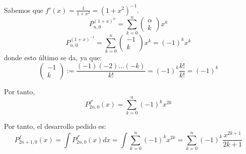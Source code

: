 \begin{ejercicio}
\begin{enumerate}
        Sabemos que $f'(x) = \frac{1}{1+x^2} = (1+x^2)^{-1}$.
        \begin{equation*}
            P_{n, 0}^{(1+x)^\alpha} = \sum_{k=0}^n \left(\begin{array}{c}
                \alpha \\ k \end{array} \right) x^k
        \end{equation*}
        \begin{equation*}
            P_{n, 0}^{(1+x)^{-1}} = \sum_{k=0}^n \left(\begin{array}{c}
                -1 \\ k \end{array} \right) x^k = (-1)^k x^k
        \end{equation*}
        donde esto último se da, ya que:
        \begin{equation*}
            \left(\begin{array}{c}
                -1 \\ k \end{array} \right)
                := \frac{(-1)(-2) \dots (-k)}{k!} = (-1)^k \frac{k!}{k!} = (-1)^k
        \end{equation*}

        Por tanto,
        \begin{equation*}
            P_{2n,0}^{f'}(x) =
            \sum_{k=0}^n (-1)^k x^{2k}
        \end{equation*}

        Por tanto, el desarrollo pedido es:
        \begin{equation*}
            P_{2n+1, 0}^f (x)
            = \int P_{2n,0}^{f'}(x) dx
            = \int \sum_{k=0}^n (-1)^k x^{2k}
            = \sum_{k=0}^n (-1)^k \frac{x^{2k+1}}{2k+1}
        \end{equation*}
    \end{enumerate}
\end{ejercicio}

